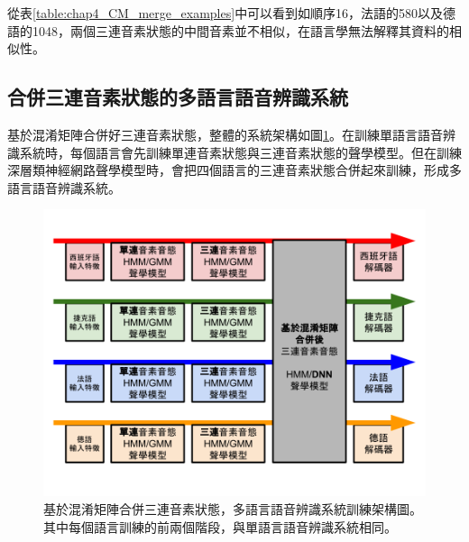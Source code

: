 從表\ref{table:chap4_CM_merge_examples}中可以看到如順序16，法語的580以及德語的1048，兩個三連音素狀態的中間音素並不相似，在語言學無法解釋其資料的相似性。

\subsection{合併三連音素狀態的多語言語音辨識系統}

基於混淆矩陣合併好三連音素狀態，整體的系統架構如圖\ref{fig:chap4_CM_framework}。在訓練單語言語音辨識系統時，每個語言會先訓練單連音素狀態與三連音素狀態的聲學模型。但在訓練深層類神經網路聲學模型時，會把四個語言的三連音素狀態合併起來訓練，形成多語言語音辨識系統。
\begin{figure}[!h]
\centering
\includegraphics[scale=0.4]{images/chap4_CM_merged.png}
\caption{基於混淆矩陣合併三連音素狀態，多語言語音辨識系統訓練架構圖。其中每個語言訓練的前兩個階段，與單語言語音辨識系統相同。}
\label{fig:chap4_CM_framework}
\end{figure}

